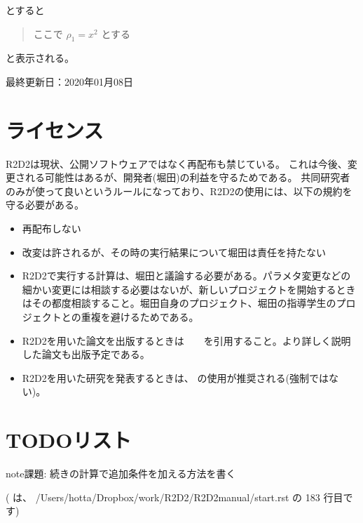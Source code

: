 \documentclass[letterpaper,10pt,dvipdfmx,report]{sphinxmanual}
\begin{document}
とすると
\begin{quote}

ここで \(\rho_1=x^2\) とする
\end{quote}

と表示される。

最終更新日：2020年01月08日


\chapter{ライセンス}
\label{\detokenize{index:id1}}
R2D2は現状、公開ソフトウェアではなく再配布も禁じている。
これは今後、変更される可能性はあるが、開発者(堀田)の利益を守るためである。
共同研究者のみが使って良いというルールになっており、R2D2の使用には、以下の規約を守る必要がある。
\begin{itemize}
\item {} 
再配布しない

\item {} 
改変は許されるが、その時の実行結果について堀田は責任を持たない

\item {} 
R2D2で実行する計算は、堀田と議論する必要がある。パラメタ変更などの細かい変更には相談する必要はないが、新しいプロジェクトを開始するときはその都度相談すること。堀田自身のプロジェクト、堀田の指導学生のプロジェクトとの重複を避けるためである。

\item {} 
R2D2を用いた論文を出版するときは　　を引用すること。より詳しく説明した論文も出版予定である。

\item {} 
R2D2を用いた研究を発表するときは、 の使用が推奨される(強制ではない)。

\end{itemize}


\chapter{TODOリスト}
\label{\detokenize{index:todo}}
\begin{sphinxadmonition}{note}{課題:}
続きの計算で追加条件を加える方法を書く
\end{sphinxadmonition}

({\hyperref[\detokenize{start:id11}]{}} は、 /Users/hotta/Dropbox/work/R2D2/R2D2\sphinxhyphen{}manual/start.rst の 183 行目です)
\end{document}
